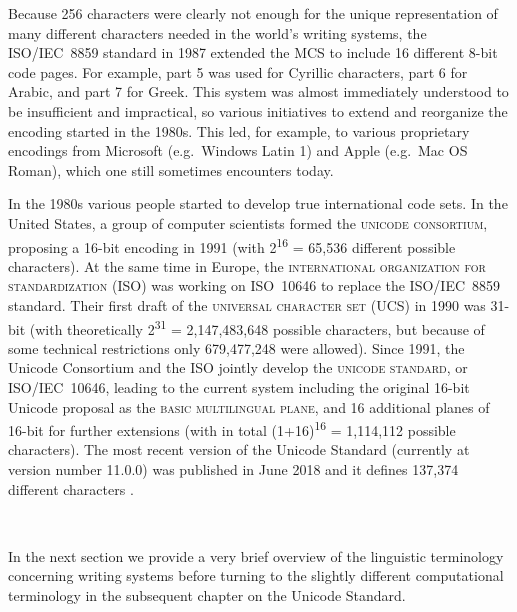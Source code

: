 Because 256 characters were clearly not enough for the unique representation of 
many different characters
needed in the world's writing systems, the ISO/IEC~8859 standard in 1987
extended the MCS to include 16 different 8-bit code pages. For example, part 5
was used for Cyrillic characters, part 6 for Arabic, and part 7 for
Greek. %
This system was almost immediately 
understood to be insufficient and impractical, so various initiatives to extend
and reorganize the encoding started in the 1980s. This led, for example, to
various proprietary encodings from Microsoft (e.g.~Windows Latin 1) and Apple
(e.g.~Mac OS Roman), which one still sometimes encounters today. 

In the 1980s various people started to develop true
international code sets. In the United States, a group of computer scientists
formed the \textsc{unicode consortium}, proposing a 16-bit encoding in 1991
(with 2\textsuperscript{16} = 65,536 different possible characters). At the same time in
Europe, the \textsc{international organization for standardization} (ISO) was
working on ISO~10646 to replace the ISO/IEC~8859 standard. Their first draft of
the \textsc{universal character set} (UCS) in 1990 was 31-bit (with
theoretically 2\textsuperscript{31} = 2,147,483,648 possible characters, but because of some
technical restrictions only 679,477,248 were allowed). Since 1991, the Unicode
Consortium and the ISO jointly develop the \textsc{unicode standard}, or
ISO/IEC~10646, leading to the current system including the original 16-bit
Unicode proposal as the \textsc{basic multilingual plane}, and 16 additional
planes of 16-bit for further extensions (with in total (1+16)\textsuperscript{16} =
1,114,112 possible characters). The most recent version of the Unicode Standard
(currently at version number 11.0.0) was published in June 2018 and it defines
137,374 different characters \citep{Unicode2018}.

\ 

\noindent In the next section we provide a very brief overview of the linguistic
terminology concerning writing systems before turning to the slightly different
computational terminology in the subsequent chapter on the Unicode Standard. 

